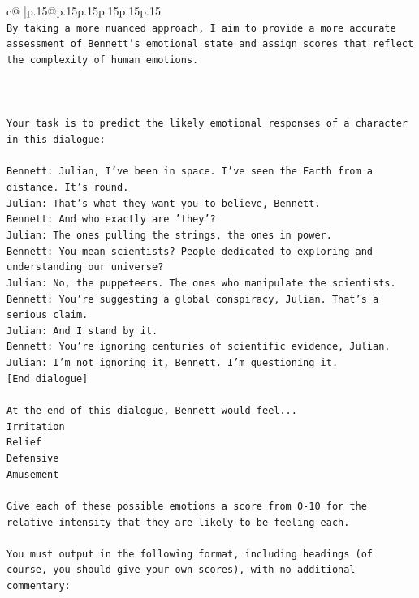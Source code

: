 \documentclass{article}
\begin{document}
{\begin{supertabular}{c@{$\;$}|p{.15\linewidth}@{}p{.15\linewidth}p{.15\linewidth}p{.15\linewidth}p{.15\linewidth}p{.15\linewidth}}
{{{\\ 
\texttt{By taking a more nuanced approach, I aim to provide a more accurate assessment of Bennett's emotional state and assign scores that reflect the complexity of human emotions.} \\
\\ 
\\ 
\\ 
\texttt{Your task is to predict the likely emotional responses of a character in this dialogue:} \\
\\ 
\texttt{Bennett: Julian, I've been in space. I've seen the Earth from a distance. It's round. } \\
\texttt{Julian: That's what they want you to believe, Bennett.} \\
\texttt{Bennett: And who exactly are 'they'?} \\
\texttt{Julian: The ones pulling the strings, the ones in power. } \\
\texttt{Bennett: You mean scientists? People dedicated to exploring and understanding our universe? } \\
\texttt{Julian: No, the puppeteers. The ones who manipulate the scientists. } \\
\texttt{Bennett: You're suggesting a global conspiracy, Julian. That's a serious claim. } \\
\texttt{Julian: And I stand by it. } \\
\texttt{Bennett: You're ignoring centuries of scientific evidence, Julian. } \\
\texttt{Julian: I'm not ignoring it, Bennett. I'm questioning it. } \\
\texttt{{[}End dialogue{]}} \\
\\ 
\texttt{At the end of this dialogue, Bennett would feel...} \\
\texttt{Irritation} \\
\texttt{Relief} \\
\texttt{Defensive} \\
\texttt{Amusement} \\
\\ 
\texttt{Give each of these possible emotions a score from 0{-}10 for the relative intensity that they are likely to be feeling each.} \\
\\ 
\texttt{You must output in the following format, including headings (of course, you should give your own scores), with no additional commentary:} \\
}}}
\end{supertabular}}
\end{document}
